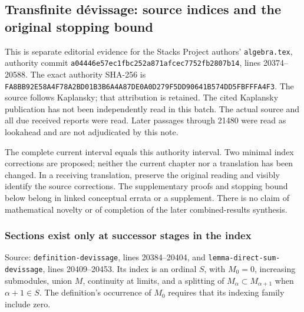 \subsection{Transfinite dévissage: source indices and the original stopping bound}\label{algebra-proof-011-transfinite-duxe9vissage-source-indices-and-the-original-stopping-bound}

This is separate editorial evidence for the Stacks Project authors' \texttt{algebra.tex}, authority commit \texttt{a044\allowbreak{}46e5\allowbreak{}7ec1\allowbreak{}fbc2\allowbreak{}52a8\allowbreak{}71af\allowbreak{}cec7\allowbreak{}752f\allowbreak{}b280\allowbreak{}7b14}, lines 20374--20588. The exact authority SHA-256 is \texttt{FA8B\allowbreak{}B92E\allowbreak{}58A4\allowbreak{}F78A\allowbreak{}2BD0\allowbreak{}1B3B\allowbreak{}6A4A\allowbreak{}87DE\allowbreak{}0A0D\allowbreak{}279F\allowbreak{}5DD9\allowbreak{}0641\allowbreak{}B574\allowbreak{}DD5F\allowbreak{}BFFF\allowbreak{}A4F3}. The source follows Kaplansky; that attribution is retained. The cited Kaplansky publication has not been independently read in this batch. The actual source and all due received reports were read. Later passages through 21480 were read as lookahead and are not adjudicated by this note.

The complete current interval equals this authority interval. Two minimal index corrections are proposed; neither the current chapter nor a translation has been changed. In a receiving translation, preserve the original reading and visibly identify the source corrections. The supplementary proofs and stopping bound below belong in linked conceptual errata or a supplement. There is no claim of mathematical novelty or of completion of the later combined-results synthesis.

\subsubsection{Sections exist only at successor stages in the index}\label{algebra-proof-011-sections-exist-only-at-successor-stages-in-the-index}

Source: \texttt{definition-\AlgebraIdentifierBreak{}devissage}, lines 20384--20404, and \texttt{lemma-\AlgebraIdentifierBreak{}direct-\AlgebraIdentifierBreak{}sum-\AlgebraIdentifierBreak{}devissage}, lines 20409--20453. Its index is an ordinal \(S\), with \(M_0=0\), increasing submodules, union \(M\), continuity at limits, and a splitting of \(M_\alpha\subset M_{\alpha+1}\) when \(\alpha+1\in S\). The definition's occurrence of \(M_0\) requires that its indexing family include zero.

